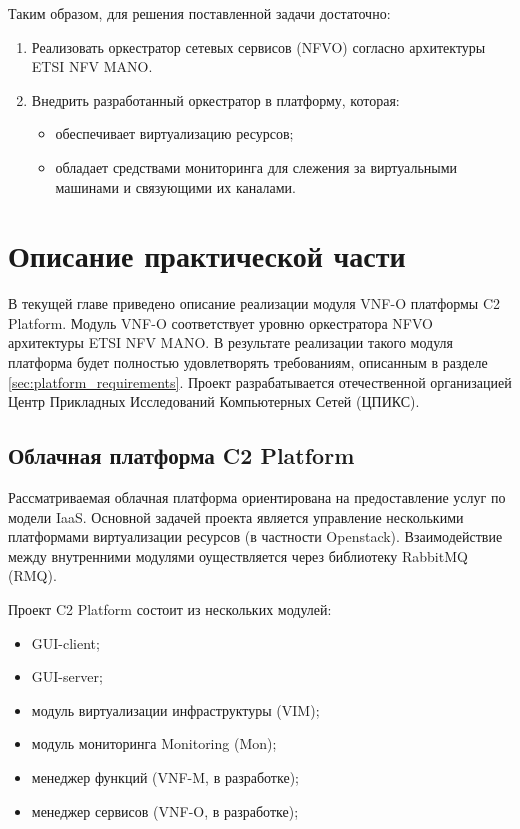 \documentclass[oneside,final,14pt,a4paper]{extreport}
\begin{document}
Таким образом, для решения поставленной задачи достаточно:
\begin{enumerate}
	\item Реализовать оркестратор сетевых сервисов (NFVO) согласно архитектуры ETSI NFV MANO.
	\item Внедрить разработанный оркестратор в платформу, которая:
	\begin{itemize}
		\item обеспечивает виртуализацию ресурсов;
		\item обладает средствами мониторинга для слежения за виртуальными машинами и связующими их каналами.
	\end{itemize}
\end{enumerate}





\chapter{Описание практической части}
\label{chap:practice}
В текущей главе приведено описание реализации модуля VNF-O платформы C2 Platform. Модуль VNF-O соответствует уровню оркестратора NFVO архитектуры ETSI NFV MANO. В результате реализации такого модуля платформа будет полностью удовлетворять требованиям, описанным в разделе \ref{sec:platform_requirements}. Проект разрабатывается отечественной организацией Центр Прикладных Исследований Компьютерных Сетей (ЦПИКС). \cite{bib:arccn}

\section{Облачная платформа C2 Platform}
\label{sec:c2-platform-description}
Рассматриваемая облачная платформа ориентирована на предоставление услуг по модели IaaS. Основной задачей проекта является управление несколькими платформами виртуализации ресурсов (в частности Openstack). Взаимодействие между внутренними модулями оуществляется через библиотеку RabbitMQ (RMQ). \cite{bib:rabbitmq}

Проект C2 Platform состоит из нескольких модулей:
\begin{itemize}
	\item GUI-client;
	\item GUI-server;
	\item модуль виртуализации инфраструктуры (VIM);
	\item модуль мониторинга Monitoring (Mon);
	\item менеджер функций (VNF-M, в разработке);
	\item менеджер сервисов (VNF-O, в разработке);
\end{itemize}
\end{document}
